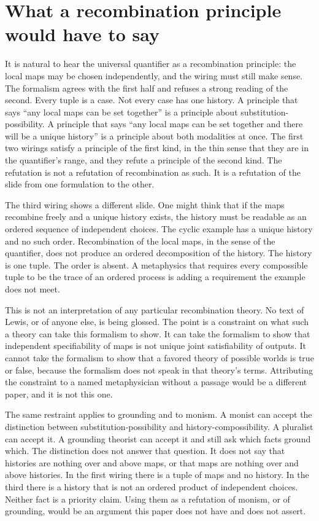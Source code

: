 \documentclass[11pt]{article}
\begin{document}
\section{What a recombination principle would have to say}
\label{sec:rec}

It is natural to hear the universal quantifier as a recombination principle: the local maps may be chosen independently, and the wiring must still make sense. The formalism agrees with the first half and refuses a strong reading of the second. Every tuple is a case. Not every case has one history. A principle that says ``any local maps can be set together'' is a principle about substitution-possibility. A principle that says ``any local maps can be set together and there will be a unique history'' is a principle about both modalities at once. The first two wirings satisfy a principle of the first kind, in the thin sense that they are in the quantifier's range, and they refute a principle of the second kind. The refutation is not a refutation of recombination as such. It is a refutation of the slide from one formulation to the other.

The third wiring shows a different slide. One might think that if the maps recombine freely and a unique history exists, the history must be readable as an ordered sequence of independent choices. The cyclic example has a unique history and no such order. Recombination of the local maps, in the sense of the quantifier, does not produce an ordered decomposition of the history. The history is one tuple. The order is absent. A metaphysics that requires every compossible tuple to be the trace of an ordered process is adding a requirement the example does not meet.

This is not an interpretation of any particular recombination theory. No text of Lewis, or of anyone else, is being glossed. The point is a constraint on what such a theory can take this formalism to show. It can take the formalism to show that independent specifiability of maps is not unique joint satisfiability of outputs. It cannot take the formalism to show that a favored theory of possible worlds is true or false, because the formalism does not speak in that theory's terms. Attributing the constraint to a named metaphysician without a passage would be a different paper, and it is not this one.

The same restraint applies to grounding and to monism. A monist can accept the distinction between substitution-possibility and history-compossibility. A pluralist can accept it. A grounding theorist can accept it and still ask which facts ground which. The distinction does not answer that question. It does not say that histories are nothing over and above maps, or that maps are nothing over and above histories. In the first wiring there is a tuple of maps and no history. In the third there is a history that is not an ordered product of independent choices. Neither fact is a priority claim. Using them as a refutation of monism, or of grounding, would be an argument this paper does not have and does not assert.
\end{document}
